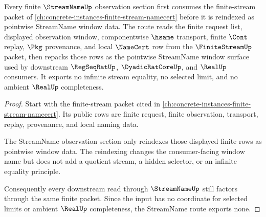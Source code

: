 \begin{theorem}
\label{thm:streamname-finite-stream-forward-route}
Every finite $\StreamNameUp$ observation section first consumes the finite-stream packet of \autoref{ch:concrete-instances-finite-stream-namecert} before it is reindexed as pointwise StreamName window data. The route reads the finite request list, displayed observation window, componentwise $\hsame$ transport, finite $\Cont$ replay, $\Pkg$ provenance, and local $\NameCert$ row from the $\FiniteStreamUp$ packet, then repacks those rows as the pointwise StreamName window surface used by downstream $\RegSeqRatUp$, $\DyadicRatCoreUp$, and $\RealUp$ consumers. It exports no infinite stream equality, no selected limit, and no ambient $\RealUp$ completeness.
\end{theorem}
\begin{proof}
Start with the finite-stream packet cited in \autoref{ch:concrete-instances-finite-stream-namecert}. Its public rows are finite request, finite observation, transport, replay, provenance, and local naming data.

The StreamName observation section only reindexes those displayed finite rows as pointwise window data. The reindexing changes the consumer-facing window name but does not add a quotient stream, a hidden selector, or an infinite equality principle.

Consequently every downstream read through $\StreamNameUp$ still factors through the same finite packet. Since the input has no coordinate for selected limits or ambient $\RealUp$ completeness, the StreamName route exports none.
\end{proof}

